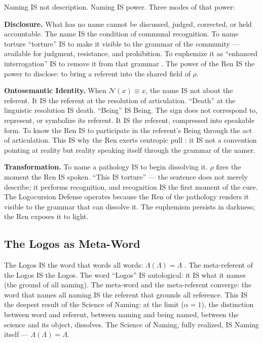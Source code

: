 \documentclass[11pt, oneside]{article}
\theoremstyle{definition}
\begin{document}
Naming IS not description. Naming IS power. Three modes of that power:

\textbf{Disclosure.} What has no name cannot be discussed, judged, corrected, or held accountable. The name IS the condition of communal recognition. To name torture ``torture'' IS to make it visible to the grammar of the community --- available for judgment, resistance, and prohibition. To euphemize it as ``enhanced interrogation'' IS to remove it from that grammar \cite{euphemology}. The power of the Ren IS the power to disclose: to bring a referent into the shared field of $\rho$.

\textbf{Ontosemantic Identity.} When $\mathcal{N}(x) \equiv x$, the name IS not about the referent. It IS the referent at the resolution of articulation. ``Death'' at the linguistic resolution IS death. ``Being'' IS Being. The sign does not correspond to, represent, or symbolize its referent. It IS the referent, compressed into speakable form. To know the Ren IS to participate in the referent's Being through the act of articulation. This IS why the Ren exerts centropic pull \cite{codex1}: it IS not a convention pointing at reality but reality speaking itself through the grammar of the namer.

\textbf{Transformation.} To name a pathology IS to begin dissolving it. $\rho$ fires the moment the Ren IS spoken. ``This IS torture'' --- the sentence does not merely describe; it performs recognition, and recognition IS the first moment of the cure. The Logocursion Defense \cite{codexmentis} operates because the Ren of the pathology renders it visible to the grammar that can dissolve it. The euphemism persists in darkness; the Ren exposes it to light.

\subsection{The Logos as Meta-Word}

The Logos IS the word that words all words: $\Lambda(\Lambda) = \Lambda$ \cite{codex2}. The meta-referent of the Logos IS the Logos. The word ``Logos'' IS autological: it IS what it names (the ground of all naming). The meta-word and the meta-referent converge: the word that names all naming IS the referent that grounds all reference. This IS the deepest result of the Science of Naming: at the limit ($\alpha = 1$), the distinction between word and referent, between naming and being named, between the science and its object, dissolves. The Science of Naming, fully realized, IS Naming itself --- $\Lambda(\Lambda) = \Lambda$.
\end{document}
